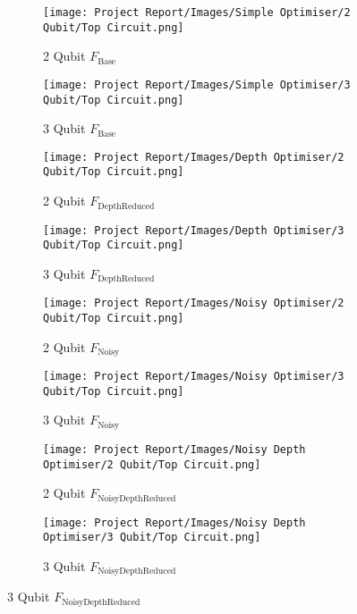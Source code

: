 \documentclass[11pt,a4paper]{article}
\begin{document}
\begin{figure}[H]
    \centering
    \begin{subfigure}[t]{0.45\textwidth}
        \texttt{[image: Project Report/Images/Simple Optimiser/2 Qubit/Top Circuit.png]}
        \caption{2 Qubit $F_{\mathrm{Base}}$}
        \label{fig:struct_base_2q}
    \end{subfigure}
    \hfill
    \begin{subfigure}[t]{0.45\textwidth}
        \texttt{[image: Project Report/Images/Simple Optimiser/3 Qubit/Top Circuit.png]}
        \caption{3 Qubit $F_{\mathrm{Base}}$}
        \label{fig:struct_base_3q}
    \end{subfigure}

    \vspace{1em}

    \begin{subfigure}[t]{0.45\textwidth}
        \texttt{[image: Project Report/Images/Depth Optimiser/2 Qubit/Top Circuit.png]}
        \caption{2 Qubit $F_{\mathrm{DepthReduced}}$}
        \label{fig:struct_depth_2q}
    \end{subfigure}
    \hfill
    \begin{subfigure}[t]{0.45\textwidth}
        \texttt{[image: Project Report/Images/Depth Optimiser/3 Qubit/Top Circuit.png]}
        \caption{3 Qubit $F_{\mathrm{DepthReduced}}$}
        \label{fig:struct_depth_3q}
    \end{subfigure}

    \vspace{1em}

    \begin{subfigure}[t]{0.45\textwidth}
        \texttt{[image: Project Report/Images/Noisy Optimiser/2 Qubit/Top Circuit.png]}
        \caption{2 Qubit $F_{\mathrm{Noisy}}$}
        \label{fig:struct_noisy_2q}
    \end{subfigure}
    \hfill
    \begin{subfigure}[t]{0.45\textwidth}
        \texttt{[image: Project Report/Images/Noisy Optimiser/3 Qubit/Top Circuit.png]}
        \caption{3 Qubit $F_{\mathrm{Noisy}}$}
        \label{fig:struct_noisy_3q}
    \end{subfigure}

    \vspace{1em}

    \begin{subfigure}[t]{0.45\textwidth}
        \texttt{[image: Project Report/Images/Noisy Depth Optimiser/2 Qubit/Top Circuit.png]}
        \caption{2 Qubit $F_{\mathrm{NoisyDepthReduced}}$}
        \label{fig:struct_noisydepth_2q}
    \end{subfigure}
    \hfill
    \begin{subfigure}[t]{0.45\textwidth}
        \texttt{[image: Project Report/Images/Noisy Depth Optimiser/3 Qubit/Top Circuit.png]}
        \caption{3 Qubit $F_{\mathrm{NoisyDepthReduced}}$}
        \label{fig:struct_noisydepth_3q}
    \end{subfigure}


\end{figure}
\end{document}
